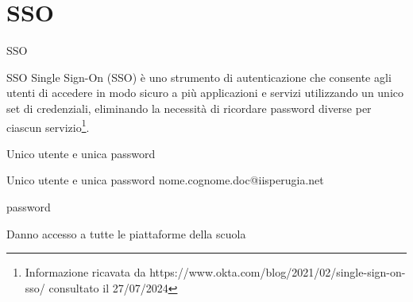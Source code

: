 \section{SSO}
\begin{frame}{SSO}
	\begin{alertblock}{SSO}
		Single Sign-On (SSO) è uno strumento di autenticazione che consente agli utenti di accedere in modo sicuro a più applicazioni e servizi utilizzando un unico set di credenziali, eliminando la necessità di ricordare password diverse per ciascun servizio\footnote{Informazione ricavata da https://www.okta.com/blog/2021/02/single-sign-on-sso/ consultato il 27/07/2024}.
	\end{alertblock}
\end{frame}
\begin{frame}{Unico utente e unica password}
	\begin{alertblock}{Unico utente e unica password}
		nome.cognome.doc@iisperugia.net
		
		password 
		
		Danno accesso a tutte le piattaforme della scuola
	\end{alertblock}
\end{frame}